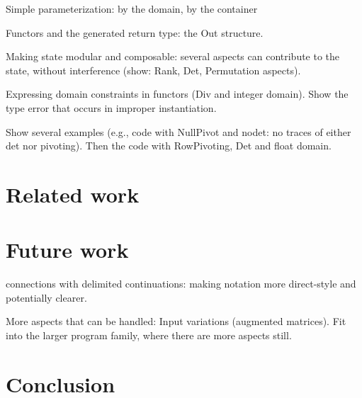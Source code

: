 \documentclass[11pt]{llncs}
\begin{document}
Simple parameterization: by the domain, by the container
 
Functors and the generated return type: the Out structure.

Making state modular and composable: several aspects can contribute
to the state, without interference (show: Rank, Det, Permutation
aspects).

Expressing domain constraints in functors (Div and integer domain).
Show the type error that occurs in improper instantiation.

Show several examples (e.g., code with NullPivot and nodet: no traces
of either det nor pivoting). Then the code with RowPivoting, Det and
float domain.

\section{Related work}

\section{Future work}
connections with delimited continuations: making notation
more direct-style and potentially clearer.

More aspects that can be handled: Input variations (augmented
matrices). Fit into the larger program family, where there are
more aspects still.

\section{Conclusion}



\end{document}
